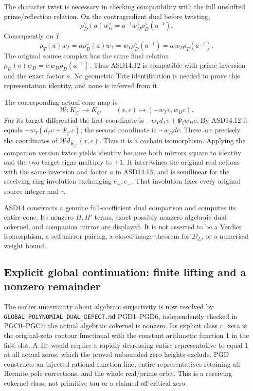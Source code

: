 The character twist is necessary in checking compatibility with the full
unshifted prime/reflection relation. On the contragredient dual before
twisting, \[
 \rho_D^\vee(a)w_D^\vee
   =a^{-1}w_D^\vee\rho_D^\vee(a^{-1}).
\] Consequently on \(T\) \[
 \rho_T(a)w_T
 =a\rho_D^\vee(a)w_T
 =w_T\rho_D^\vee(a^{-1})
 =a\,w_T\rho_T(a^{-1}).
 \tag{ASD14.13}
\] The original source complex has the same final relation
\(\rho_D(a)w_D=a\,w_D\rho_D(a^{-1})\). Thus ASD14.12 is compatible with
prime inversion and the exact factor \(a\). No geometric Tate
identification is needed to prove this representation identity, and none
is inferred from it.

The corresponding actual cone map is \[
 \mathcal W:K_{\zeta^\vee}\longrightarrow K_\zeta,\qquad
 (v,c)\longmapsto(-w_Tv,w_Dc).
 \tag{ASD14.14}
\] For its target differential the first coordinate is
\(-w_Td_Tv+\Psi_\zeta w_Dc\). By ASD14.12 it equals
\(-w_T(d_Tv+\Psi_{\zeta^\vee}c)\); the second coordinate is \(-w_Ddc\).
These are precisely the coordinates of
\(\mathcal Wd_{K_{\zeta^\vee}}(v,c)\). Thus it is a cochain isomorphism.
Applying the companion version twice yields identity because both
mirrors square to identity and the two target signs multiply to \(+1\).
It intertwines the original real actions with the same inversion and
factor \(a\) in ASD14.13, and is semilinear for the receiving ring
involution exchanging \(e_+,e_-\). That involution fixes every original
source integer and \(\tau\).

ASD14 constructs a genuine full-coefficient dual comparison and computes
its entire cone. Its nonzero \(H,H'\) terms, exact possibly nonzero
algebraic dual cokernel, and companion mirror are displayed. It is not
asserted to be a Verdier isomorphism, a self-mirror pairing, a
closed-image theorem for \(\mathcal D_L\), or a numerical weight bound.

\subsection{Explicit global continuation: finite lifting and a nonzero
remainder}\label{explicit-global-continuation-finite-lifting-and-a-nonzero-remainder}

The earlier uncertainty about algebraic surjectivity is now resolved by
\nolinkurl{GLOBAL_POLYNOMIAL_DUAL_DEFECT.md} PGD1--PGD6, independently checked in
PGC0--PGC7: the actual algebraic cokernel is nonzero. Its explicit class
c\_zeta is the original-zeta contour functional with the constant
arithmetic function 1 in the first slot. A lift would require a rapidly
decreasing entire representative to equal 1 at all actual zeros, which
the proved unbounded zero heights exclude. PGD constructs an injected
rational-function line, entire representatives retaining all Hermite
pole corrections, and the whole real/prime orbit. This is a receiving
cokernel class, not primitive tau or a claimed off-critical zero.

